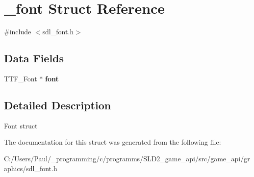 \hypertarget{struct__font}{\section{\+\_\+font Struct Reference}
\label{struct__font}
}


{\ttfamily \#include $<$sdl\+\_\+font.\+h$>$}

\subsection*{Data Fields}
\begin{DoxyCompactItemize}
\item 
\hypertarget{struct__font_abf5bfa705e66ffc1ddaa6ce46c960873}{T\+T\+F\+\_\+\+Font $\ast$ {\bfseries font}}\label{struct__font_abf5bfa705e66ffc1ddaa6ce46c960873}

\end{DoxyCompactItemize}


\subsection{Detailed Description}
Font struct 

The documentation for this struct was generated from the following file\+:\begin{DoxyCompactItemize}
\item 
C\+:/\+Users/\+Paul/\+\_\+programming/c/programms/\+S\+L\+D2\+\_\+game\+\_\+api/src/game\+\_\+api/graphics/sdl\+\_\+font.\+h\end{DoxyCompactItemize}
